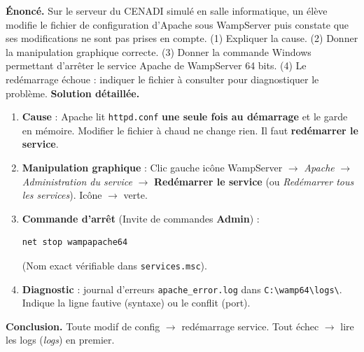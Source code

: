 \documentclass[11pt]{article}
\begin{document}
\begin{exoresolu}
\textbf{Énoncé.} Sur le serveur du CENADI simulé en salle informatique, un élève modifie le fichier de configuration d'Apache sous WampServer puis constate que ses modifications ne sont pas prises en compte. (1) Expliquer la cause. (2) Donner la manipulation graphique correcte. (3) Donner la commande Windows permettant d'arrêter le service Apache de WampServer 64 bits. (4) Le redémarrage échoue : indiquer le fichier à consulter pour diagnostiquer le problème.
\tcblower
\textbf{Solution détaillée.}
\begin{enumerate}
\item \textbf{Cause} : Apache lit \texttt{httpd.conf} \textbf{une seule fois au démarrage} et le garde en mémoire. Modifier le fichier à chaud ne change rien. Il faut \textbf{redémarrer le service}.
\item \textbf{Manipulation graphique} : Clic gauche icône WampServer $\rightarrow$ \emph{Apache} $\rightarrow$ \emph{Administration du service} $\rightarrow$ \textbf{Redémarrer le service} (ou \emph{Redémarrer tous les services}). Icône $\rightarrow$ verte.
\item \textbf{Commande d'arrêt} (Invite de commandes \textbf{Admin}) :
\begin{lstlisting}[language=bash]
net stop wampapache64
\end{lstlisting}
(Nom exact vérifiable dans \texttt{services.msc}).
\item \textbf{Diagnostic} : journal d'erreurs \texttt{apache\_error.log} dans \texttt{C:\textbackslash wamp64\textbackslash logs\textbackslash}. Indique la ligne fautive (syntaxe) ou le conflit (port).
\end{enumerate}
\textbf{Conclusion.} Toute modif de config $\rightarrow$ redémarrage service. Tout échec $\rightarrow$ lire les logs (\emph{logs}) en premier.
\end{exoresolu}
\end{document}
